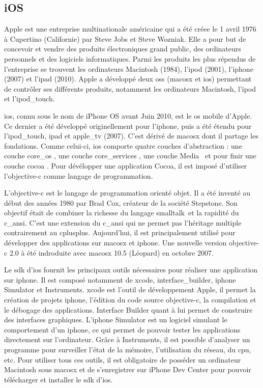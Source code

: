 \subsection{iOS}
	Apple est une entreprise multinationale américaine qui a été créee le 1
	avril 1976 à Cupertino (Californie) par Steve Jobs et Steve Wozniak. Elle a
	pour but de concevoir et vendre des produits électroniques grand public, des
	ordinateurs personnels et des logiciels informatiques. Parmi les produits les
	plus répendus de l'entreprise se trouvent les ordinateurs Macintosh (1984),
	l'\gls{ipod} (2001), l'\gls{iphone} (2007) et l'\gls{ipad} (2010). Apple a
	développé deux \glspl{os} (\gls{macosx} et \gls{ios})
	permettant de contrôler ses différents produits, notamment les ordinateurs 
	Macintosh, l'\gls{ipod} et l'\gls{ipod_touch}.
			
	\gls{ios}, connu sous le nom de iPhone OS avant Juin 2010, est le \gls{os} 
	mobile d'Apple. Ce dernier a été développé originellement pour l'\gls{iphone}, puis a été étendu pour l'\gls{ipod_touch}, \gls{ipad} et
	\gls{apple_tv} (2007). C'est dérivé de \gls{macosx}  dont il partage les 
	fondations. Comme celui-ci, \gls{ios} comporte quatre couches d'abstraction : une
	couche \og \gls{core_os} \fg, une couche \og \gls{core_services} \fg, une
	couche \og Media \fg \, et pour finir une couche \og \gls{cocoa} \fg. Pour
	dévélopper une application Cocoa, il est imposé d'utiliser l'\gls{objective-c} comme
	langage de programmation.
			
	L'\gls{objective-c} est le langage de programmation orienté objet. Il a été inventé
	au début des années 1980 par Brad Cox, créateur de la société Stepstone. Son
	objectif était de combiner la richesse du langage \gls{smalltalk}\, et la
	rapidité du \gls{c_ansi}. 
	C'est une extension du \gls{c_ansi} qui ne permet pas l'héritage multiple
	contrairement au \gls{cplusplus}. Aujourd'hui, il est principalement utilisé
	pour développer des applications sur \gls{macosx} et \gls{iphone}. Une nouvelle version
	\gls{objective-c} 2.0 à été indroduite avec \gls{macosx} 10.5 (Léopard) en octobre 2007.
			
	Le \gls{sdk} d'\gls{ios} fournit les principaux outils nécessaires pour
	réaliser une application sur \gls{iphone}. Il est composé notamment de \gls{xcode},
	\gls{interface_builder}, \gls{iphone} Simulator et Instruments. \gls{xcode} est l'outil de
	développement Apple, il permet la création de projets \gls{iphone}, l’édition du code
	source \gls{objective-c}, la compilation et le débogage des applications. Interface
	Builder quant à lui permet de construire des interfaces graphiques. L'\gls{iphone}
	Simulator est un logiciel simulant le comportement d'un \gls{iphone}, ce qui 
	permet de pouvoir tester les applications directement sur l'ordinateur. Grâce
	à Instruments, il est possible d'analyser un programme pour surveiller l’état de la
	mémoire, l’utilisation du réseau, du \gls{cpu}, etc. Pour utiliser tous ces outils,
	il est obligatoire de posséder un ordinateur Macintosh sous \gls{macosx} et de
	s'enregistrer sur iPhone Dev Center pour pouvoir télécharger et installer le
	\gls{sdk} d'\gls{ios}.
